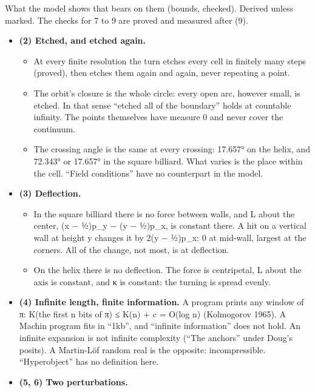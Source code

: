 What the model shows that bears on them (bounds, checked). Derived unless marked. The checks for 7 to 9 are proved and measured after (9).

\begin{itemize}
\item \textbf{(2) Etched, and etched again.}

\begin{itemize}
\item At every finite resolution the turn etches every cell in finitely many steps (proved), then etches them again and again, never repeating a point.
\item The orbit's closure is the whole circle: every open arc, however small, is etched. In that sense “etched all of the boundary” holds at countable infinity. The points themselves have measure 0 and never cover the continuum.
\item The crossing angle is the same at every crossing: 17.657° on the helix, and 72.343° or 17.657° in the square billiard. What varies is the place within the cell. “Field conditions” have no counterpart in the model.
\end{itemize}
\item \textbf{(3) Deflection.}

\begin{itemize}
\item In the square billiard there is no force between walls, and L about the center, (x − ½)p\_\allowbreak{}y − (y − ½)p\_\allowbreak{}x, is constant there. A hit on a vertical wall at height y changes it by 2(y − ½)p\_\allowbreak{}x: 0 at mid-wall, largest at the corners. All of the change, not most, is at deflection.
\item On the helix there is no deflection. The force is centripetal, L about the axis is constant, and κ is constant: the turning is spread evenly.
\end{itemize}
\item \textbf{(4) Infinite length, finite information.} A program prints any window of π: K(the first n bits of π) ≤ K(n) + c = O(log n) (Kolmogorov 1965). A Machin program fits in “1kb”, and “infinite information” does not hold. An infinite expansion is not infinite complexity (“The anchors” under Doug's posits). A Martin-Löf random real is the opposite: incompressible. “Hyperobject” has no definition here.
\item \textbf{(5, 6) Two perturbations.}


\end{itemize}
